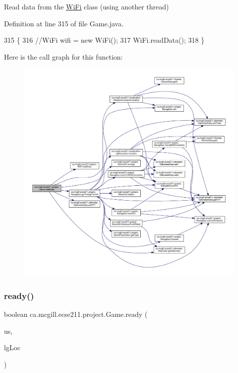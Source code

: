 Read data from the \hyperlink{enumca_1_1mcgill_1_1ecse211_1_1project_1_1_wi_fi}{Wi\+Fi} class (using another thread) 

Definition at line 315 of file Game.\+java.


\begin{DoxyCode}
315                                       \{
316     \textcolor{comment}{//WiFi wifi = new WiFi();}
317     WiFi.readData();
318   \}
\end{DoxyCode}
Here is the call graph for this function\+:
\nopagebreak
\begin{figure}[H]
\begin{center}
\leavevmode
\includegraphics[width=350pt]{enumca_1_1mcgill_1_1ecse211_1_1project_1_1_game_ab28110fca0af679acdaea84025746f15_cgraph}
\end{center}
\end{figure}
\mbox{\label{enumca_1_1mcgill_1_1ecse211_1_1project_1_1_game_a5b304a6a59ddee3f8c7d37bba8a4c129}} 
\subsubsection{\texorpdfstring{ready()}{ready()}}
{\footnotesize\ttfamily boolean ca.\+mcgill.\+ecse211.\+project.\+Game.\+ready (\begin{DoxyParamCaption}\item[{\hyperlink{classca_1_1mcgill_1_1ecse211_1_1localization_1_1_ultrasonic_localizer}{Ultrasonic\+Localizer}}]{us,  }\item[{\hyperlink{classca_1_1mcgill_1_1ecse211_1_1localization_1_1_light_localizer}{Light\+Localizer}}]{lg\+Loc }\end{DoxyParamCaption})}

